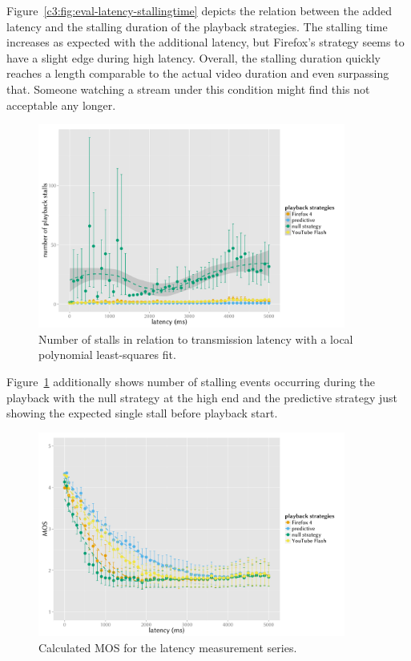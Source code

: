 Figure~\ref{c3:fig:eval-latency-stallingtime} depicts the relation between the added latency and the stalling duration of the playback strategies. The stalling time increases as expected with the additional latency, but Firefox's strategy seems to have a slight edge during high latency. Overall, the stalling duration quickly reaches a length comparable to the actual video duration and even surpassing that. Someone watching a stream under this condition might find this not acceptable any longer.

\begin{figure}[htbp]
	\centering
	\includegraphics[width=0.9\textwidth]{images/R-playbackemulation-stallnumber-latency.pdf}
	\caption{Number of stalls in relation to transmission latency with a local polynomial least-squares fit.}
\label{c3:fig:eval-latency-numstalls}
\end{figure}

Figure~\ref{c3:fig:eval-latency-numstalls} additionally shows number of stalling events occurring during the playback with the null strategy at the high end and the predictive strategy just showing the expected single stall before playback start.

\begin{figure}[htb]
	\centering
	\includegraphics[width=0.9\textwidth]{images/R-playbackemulation-qoe-latency.pdf}
	\caption{Calculated \acrshort{MOS} for the latency measurement series.}
\label{c3:fig:eval-latency-qoe}
\end{figure}

